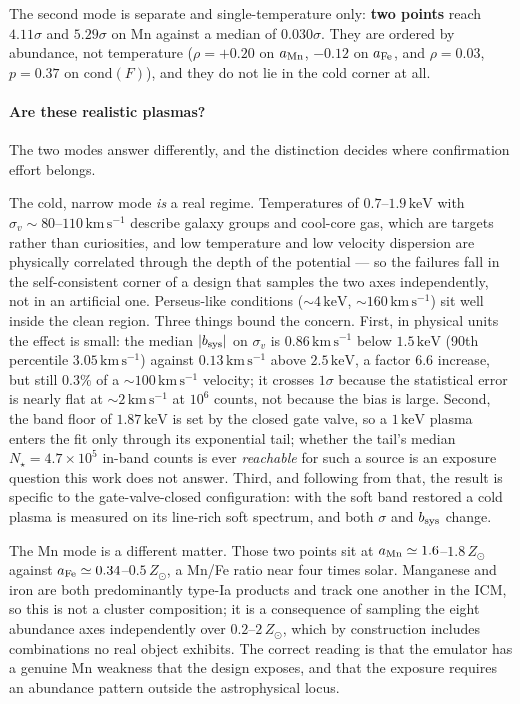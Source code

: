 \documentclass[11pt,a4paper]{article}
\newcommand{\kev}{\,\mathrm{keV}}
\newcommand{\kms}{\,\mathrm{km\,s^{-1}}}
\newcommand{\zsun}{Z_\odot}
\begin{document}
The second mode is separate and single-temperature only: \textbf{two points}
reach $4.11\sigma$ and $5.29\sigma$ on Mn against a median of $0.030\sigma$.
They are ordered by abundance, not temperature ($\rho=+0.20$ on $a_{\rm Mn}$,
$-0.12$ on $a_{\rm Fe}$, and $\rho=0.03$, $p=0.37$ on $\mathrm{cond}(F)$), and
they do not lie in the cold corner at all.

\paragraph{Are these realistic plasmas?} The two modes answer differently, and
the distinction decides where confirmation effort belongs.

The cold, narrow mode \emph{is} a real regime. Temperatures of
$0.7$--$1.9\kev$ with $\sigma_v\sim80$--$110\kms$ describe galaxy groups and
cool-core gas, which are targets rather than curiosities, and low temperature
and low velocity dispersion are physically correlated through the depth of the
potential --- so the failures fall in the self-consistent corner of a design
that samples the two axes independently, not in an artificial one.
Perseus-like conditions (${\sim}4\kev$, ${\sim}160\kms$) sit well inside the
clean region. Three things bound the concern. First, in physical units the
effect is small: the median $|b_{\rm sys}|$ on $\sigma_v$ is $0.86\kms$ below
$1.5\kev$ (90th percentile $3.05\kms$) against $0.13\kms$ above $2.5\kev$, a
factor $6.6$ increase, but still $0.3\%$ of a $\sim100\kms$ velocity; it
crosses $1\sigma$ because the statistical error is nearly flat at
${\sim}2\kms$ at $10^{6}$ counts, not because the bias is large. Second, the
band floor of $1.87\kev$ is set by the closed gate valve, so a $1\kev$ plasma
enters the fit only through its exponential tail; whether the tail's median
$N_\star=4.7\times10^{5}$ in-band counts is ever \emph{reachable} for such a
source is an exposure question this work does not answer. Third, and following
from that, the result is specific to the gate-valve-closed configuration: with
the soft band restored a cold plasma is measured on its line-rich soft
spectrum, and both $\sigma$ and $b_{\rm sys}$ change.

The Mn mode is a different matter. Those two points sit at
$a_{\rm Mn}\simeq1.6$--$1.8\,\zsun$ against $a_{\rm Fe}\simeq0.34$--$0.5\,\zsun$,
a Mn/Fe ratio near four times solar. Manganese and iron are both predominantly
type-Ia products and track one another in the ICM, so this is not a cluster
composition; it is a consequence of sampling the eight abundance axes
independently over $0.2$--$2\,\zsun$, which by construction includes
combinations no real object exhibits. The correct reading is that the emulator
has a genuine Mn weakness that the design exposes, and that the exposure
requires an abundance pattern outside the astrophysical locus.
\end{document}
